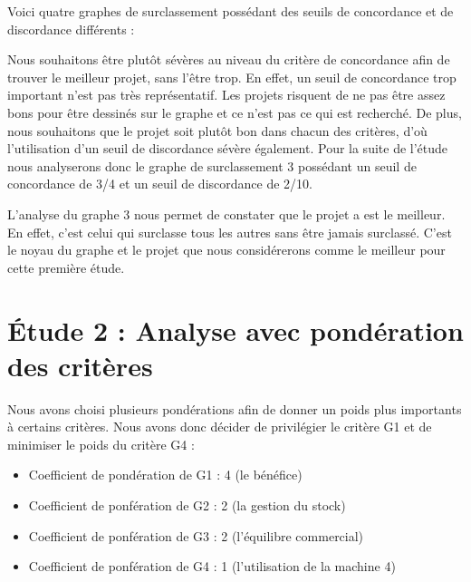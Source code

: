 \documentclass[a4paper,10pt]{article}
\begin{document}
Voici quatre graphes de surclassement possédant des seuils de concordance et de discordance différents :


Nous souhaitons être plutôt sévères au niveau du critère de concordance afin de trouver le meilleur projet, sans l'être trop. En effet, un seuil de concordance trop important n'est pas très représentatif. Les projets risquent de ne pas être assez bons pour être dessinés sur le graphe et ce n'est pas ce qui est recherché. De plus, nous souhaitons que le projet soit plutôt bon dans chacun des critères, d'où l'utilisation d'un seuil de discordance sévère également. Pour la suite de l'étude nous analyserons donc le graphe de surclassement 3 possédant un seuil de concordance de 3/4 et un seuil de discordance de 2/10.

L'analyse du graphe 3 nous permet de constater que le projet a est le meilleur. En effet, c'est celui qui surclasse tous les autres sans être jamais surclassé. C'est le noyau du graphe et le projet que nous considérerons comme le meilleur pour cette première étude.

\section{Étude 2 : Analyse avec pondération des critères}

Nous avons choisi plusieurs pondérations afin de donner un poids plus importants à certains critères. Nous avons donc décider de privilégier le critère G1 et de minimiser le poids du critère G4 :

\begin{itemize}
\item Coefficient de pondération de G1 : 4 (le bénéfice)
\item Coefficient de ponfération de G2 : 2 (la gestion du stock)
\item Coefficient de ponfération de G3 : 2 (l'équilibre commercial)
\item Coefficient de ponfération de G4 : 1 (l'utilisation de la machine 4)
\end{itemize}
\end{document}
